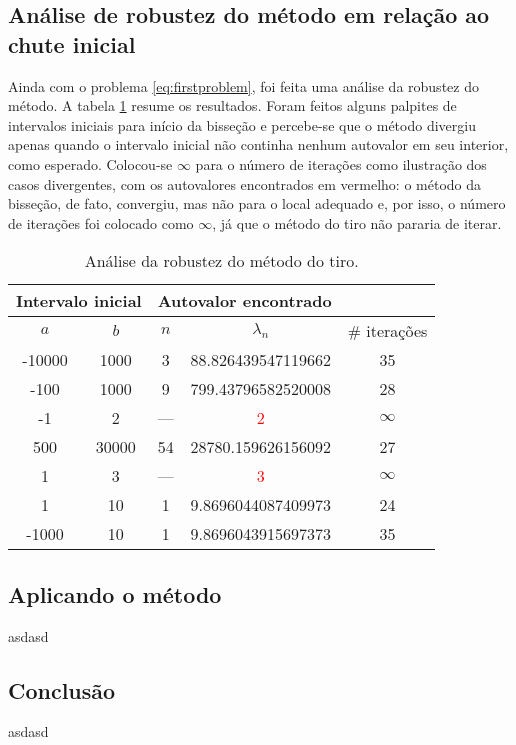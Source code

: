 \documentclass[twocolumn,showpacs,%
  nofootinbib,aps,superscriptaddress,%
  eqsecnum,prd,notitlepage,showkeys,10pt]{revtex4-1}
\begin{document}
\subsection{Análise de robustez do método em relação ao chute inicial}\label{subsec:robustez}
%
Ainda com o problema \eqref{eq:firstproblem}, foi feita uma análise da robustez do método.
A tabela \ref{tab:robustez} resume os resultados. Foram feitos alguns palpites de intervalos
iniciais para início da bisseção e percebe-se que o método divergiu apenas quando o intervalo
inicial não continha nenhum autovalor em seu interior, como esperado. Colocou-se $\infty$
para o número de iterações como ilustração dos casos divergentes, com os autovalores encontrados
em vermelho: o método da bisseção, de fato, convergiu, mas não para o local adequado e, por isso,
o número de iterações foi colocado como $\infty$, já que o método do tiro não pararia de iterar.
%
\begin{table}[H]
    \centering
    \caption{Análise da robustez do método do tiro.}
    \begin{tabular}{cc|cc|c}
        \multicolumn{2}{c}{Intervalo inicial} & \multicolumn{2}{c}{Autovalor encontrado} & \\
        \hline
        $a$ & $b$ & $n$ & $\lambda_n$ & \# iterações \\
        \hline
        -10000 & 1000 & 3 & 88.826439547119662 & 35 \\
        -100 & 1000 & 9 & 799.43796582520008 & 28 \\
        -1 & 2 & --- & \textcolor{red}{2} & $\infty$ \\
        500 & 30000 & 54 & 28780.159626156092 & 27 \\
        1 & 3 & --- & \textcolor{red}{3} & $\infty$ \\
        1 & 10 & 1 & 9.8696044087409973 & 24 \\
        -1000 & 10 & 1 & 9.8696043915697373 & 35 \\
        \hline
    \end{tabular}
    \label{tab:robustez}
\end{table}
%


%
\subsection{Aplicando o método}\label{subsec:aplicacao}
%

asdasd

%
\subsection{Conclusão}\label{subsec:conclusao}
%

asdasd

% 




\nocite{*}
% 

% 

\end{document}
